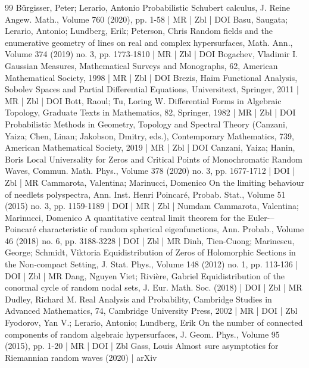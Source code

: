 \documentclass[10pt]{amsart}
\theoremstyle{definition}\newtheorem{defi}[theo]{Definition}\newtheorem{rema}[theo]{Remark}\newtheorem{exam}[theo]{Example}\newtheorem{exem}[theo]{Example}\newtheorem{nota}[theo]{Notation}
\begin{document}
\begin{thebibliography}{99}
Bürgisser, Peter; Lerario, Antonio Probabilistic Schubert calculus, J. Reine Angew. Math., Volume 760 (2020), pp. 1-58 | MR | Zbl | DOI
Basu, Saugata; Lerario, Antonio; Lundberg, Erik; Peterson, Chris Random fields and the enumerative geometry of lines on real and complex hypersurfaces, Math. Ann., Volume 374 (2019) no. 3, pp. 1773-1810 | MR | Zbl | DOI
Bogachev, Vladimir I. Gaussian Measures, Mathematical Surveys and Monographs, 62, American Mathematical Society, 1998 | MR | Zbl | DOI
Brezis, Haïm Functional Analysis, Sobolev Spaces and Partial Differential Equations, Universitext, Springer, 2011 | MR | Zbl | DOI
Bott, Raoul; Tu, Loring W. Differential Forms in Algebraic Topology, Graduate Texts in Mathematics, 82, Springer, 1982 | MR | Zbl | DOI
Probabilistic Methods in Geometry, Topology and Spectral Theory (Canzani, Yaiza; Chen, Linan; Jakobson, Dmitry, eds.), Contemporary Mathematics, 739, American Mathematical Society, 2019 | MR | Zbl | DOI
Canzani, Yaiza; Hanin, Boris Local Universality for Zeros and Critical Points of Monochromatic Random Waves, Commun. Math. Phys., Volume 378 (2020) no. 3, pp. 1677-1712 | DOI | Zbl | MR
Cammarota, Valentina; Marinucci, Domenico On the limiting behaviour of needlets polyspectra, Ann. Inst. Henri Poincaré, Probab. Stat., Volume 51 (2015) no. 3, pp. 1159-1189 | DOI | MR | Zbl | Numdam
Cammarota, Valentina; Marinucci, Domenico A quantitative central limit theorem for the Euler-–Poincaré characteristic of random spherical eigenfunctions, Ann. Probab., Volume 46 (2018) no. 6, pp. 3188-3228 | DOI | Zbl | MR
Dinh, Tien-Cuong; Marinescu, George; Schmidt, Viktoria Equidistribution of Zeros of Holomorphic Sections in the Non-compact Setting, J. Stat. Phys., Volume 148 (2012) no. 1, pp. 113-136 | DOI | Zbl | MR
Dang, Nguyen Viet; Rivière, Gabriel Equidistribution of the conormal cycle of random nodal sets, J. Eur. Math. Soc. (2018) | DOI | Zbl | MR
Dudley, Richard M. Real Analysis and Probability, Cambridge Studies in Advanced Mathematics, 74, Cambridge University Press, 2002 | MR | DOI | Zbl
Fyodorov, Yan V.; Lerario, Antonio; Lundberg, Erik On the number of connected components of random algebraic hypersurfaces, J. Geom. Phys., Volume 95 (2015), pp. 1-20 | MR | DOI | Zbl
Gass, Louis Almost sure asymptotics for Riemannian random waves (2020) | arXiv

\end{thebibliography}
\end{document}
